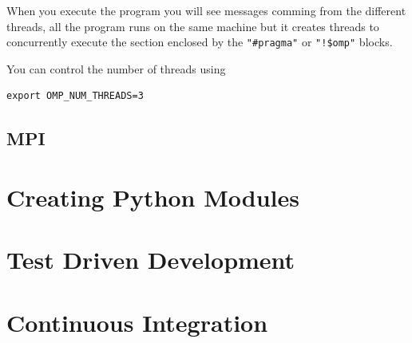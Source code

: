 When you execute the program you will see messages comming from the different threads, all the program runs on the same machine but it creates threads to concurrently execute the section enclosed by the \verb|"#pragma"| or \verb|"!$omp"|
blocks.

You can control the number of threads using

\begin{lstlisting}
export OMP_NUM_THREADS=3
\end{lstlisting}


\subsection{MPI}




\section{Creating Python Modules}
\section{Test Driven Development}
\section{Continuous Integration}
